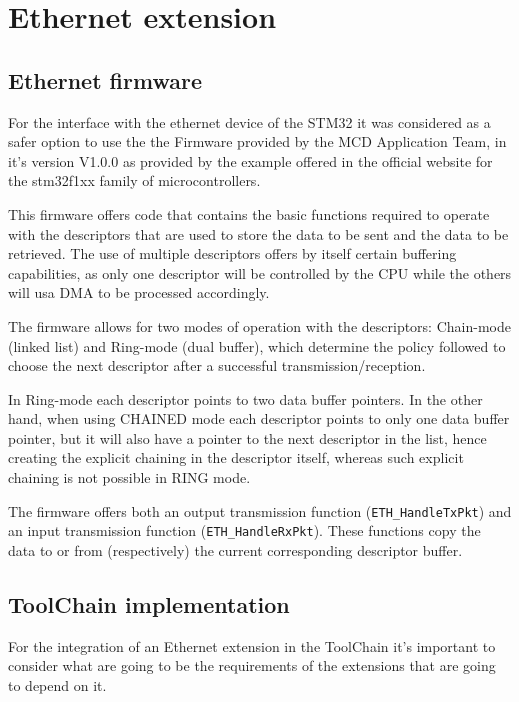 
\chapter {Ethernet extension}
\label{eth_chapter}

\section {Ethernet firmware}
\label{eth_firmware}

For the interface with the ethernet device of the STM32 it was considered as a safer option to use the the Firmware provided by the MCD Application Team, in it's version V1.0.0 as provided by the example offered in the official website for the stm32f1xx family of microcontrollers.

This firmware offers code that contains the basic functions required to operate with the descriptors that are used to store the data to be sent and the data to be retrieved. The use of multiple descriptors offers by itself certain buffering capabilities, as only one descriptor will be controlled by the CPU while the others will usa DMA to be processed accordingly.

The firmware allows for two modes of operation with the descriptors: Chain-mode (linked list) and Ring-mode (dual buffer), which determine the policy followed to choose the next descriptor after a successful transmission/reception.

In Ring-mode each descriptor points to two data buffer pointers. In the other hand, when using CHAINED mode each descriptor points to only one data buffer pointer, but it will also have a pointer to the next descriptor in the list, hence creating the explicit chaining in the descriptor itself, whereas such explicit chaining is not possible in RING mode.

The firmware offers both an output transmission function (\verb/ETH_HandleTxPkt/) and an input transmission function (\verb/ETH_HandleRxPkt/). These functions copy the data to or from (respectively) the current corresponding descriptor buffer.

\section {ToolChain implementation}

For the integration of an Ethernet extension in the ToolChain it's important to consider what are going to be the requirements of the extensions that are going to depend on it.


